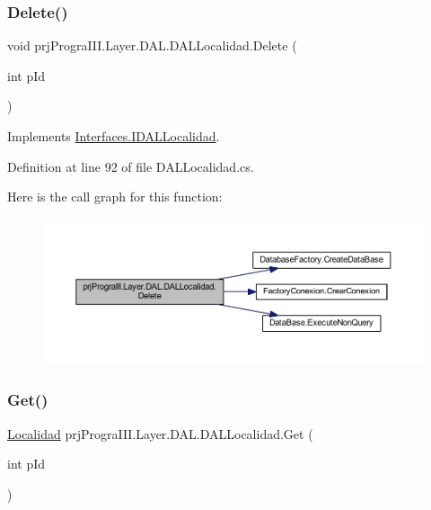 \subsubsection{\texorpdfstring{Delete()}{Delete()}}
{\footnotesize\ttfamily void prj\+Progra\+I\+I\+I.\+Layer.\+D\+A\+L.\+D\+A\+L\+Localidad.\+Delete (\begin{DoxyParamCaption}\item[{int}]{p\+Id }\end{DoxyParamCaption})}



Implements \hyperlink{interface_interfaces_1_1_i_d_a_l_localidad_ad010ce72d666cd1a2f7493b0c75c4b66}{Interfaces.\+I\+D\+A\+L\+Localidad}.



Definition at line 92 of file D\+A\+L\+Localidad.\+cs.

Here is the call graph for this function\+:
\nopagebreak
\begin{figure}[H]
\begin{center}
\leavevmode
\includegraphics[width=350pt]{classprj_progra_i_i_i_1_1_layer_1_1_d_a_l_1_1_d_a_l_localidad_a10941dad044a07cd5611800e08db6f44_cgraph}
\end{center}
\end{figure}
\hypertarget{classprj_progra_i_i_i_1_1_layer_1_1_d_a_l_1_1_d_a_l_localidad_a0763adaaedb581f36a311344b109ef83}{}\label{classprj_progra_i_i_i_1_1_layer_1_1_d_a_l_1_1_d_a_l_localidad_a0763adaaedb581f36a311344b109ef83} 
\subsubsection{\texorpdfstring{Get()}{Get()}}
{\footnotesize\ttfamily \hyperlink{classprj_progra_i_i_i_1_1_layer_1_1_entities_1_1_localidad}{Localidad} prj\+Progra\+I\+I\+I.\+Layer.\+D\+A\+L.\+D\+A\+L\+Localidad.\+Get (\begin{DoxyParamCaption}\item[{int}]{p\+Id }\end{DoxyParamCaption})}



